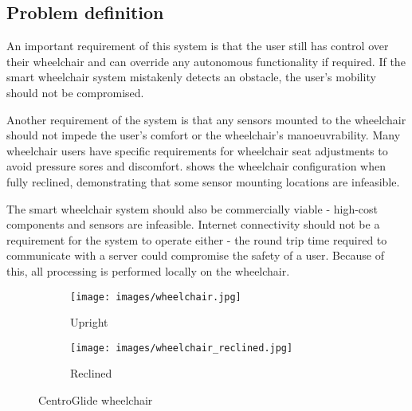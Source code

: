 \pagebreak
\subsection{Problem definition}
An important requirement of this system is that the user still
has control over their wheelchair and can override any autonomous functionality
if required. If the smart wheelchair system mistakenly detects an obstacle,
the user's mobility should not be compromised.

Another requirement of the system is that any sensors mounted to the wheelchair
should not impede the user's comfort or the wheelchair's manoeuvrability.
Many wheelchair users have specific requirements for wheelchair seat adjustments
to avoid pressure sores and discomfort.  shows the
wheelchair configuration when fully reclined, demonstrating that some sensor mounting locations
are infeasible.

The smart wheelchair system should also be commercially viable - high-cost
components and sensors are infeasible. Internet connectivity should not be a requirement
for the system to operate either - the round trip time required to communicate with a server
could compromise the safety of a user. Because of this, all processing is performed locally
on the wheelchair.

\begin{figure}[b]
    \centering
    \begin{subfigure}{.45\textwidth}
        \centering
        \texttt{[image: images/wheelchair.jpg]}
        \caption{Upright}
    \end{subfigure}
    \quad
    \begin{subfigure}{.45\textwidth}
        \centering
        \texttt{[image: images/wheelchair\_reclined.jpg]}
        \caption{Reclined}
    \end{subfigure}
    \caption{CentroGlide wheelchair}
    \label{fig:wheelchair}
\end{figure}
